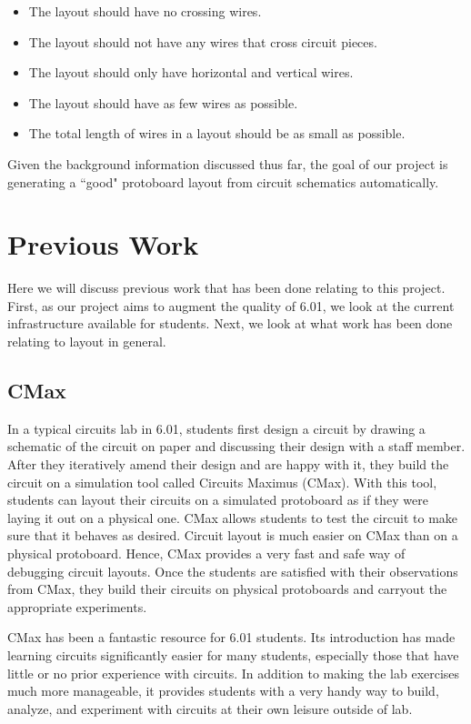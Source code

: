 \begin{itemize}
\item The layout should have no crossing wires.
\item The layout should not have any wires that cross circuit pieces.
\item The layout should only have horizontal and vertical wires.
\item The layout should have as few wires as possible.
\item The total length of wires in a layout should be as small as possible.
\end{itemize}

Given the background information discussed thus far, the goal of our project is
generating a ``good" protoboard layout from circuit schematics automatically.

\section{Previous Work}

Here we will discuss previous work that has been done relating to this project.
First, as our project aims to augment the quality of 6.01, we look at the
current infrastructure available for students. Next, we look at what work has
been done relating to layout in general.

\subsection{CMax}

In a typical circuits lab in 6.01, students first design a circuit by drawing a
schematic of the circuit on paper and discussing their design with a staff
member. After they iteratively amend their design and are happy with it, they
build the circuit on a simulation tool called Circuits Maximus (CMax). With this
tool, students can layout their circuits on a simulated protoboard as if they
were laying it out on a physical one. CMax allows students to test the circuit
to make sure that it behaves as desired. Circuit layout is much easier on CMax
than on a physical protoboard. Hence, CMax provides a very fast and safe way of
debugging circuit layouts. Once the students are satisfied with their
observations from CMax, they build their circuits on physical protoboards and
carryout the appropriate experiments.

CMax has been a fantastic resource for 6.01 students. Its introduction has made
learning circuits significantly easier for many students, especially those that
have little or no prior experience with circuits. In addition to making the lab
exercises much more manageable, it provides students with a very handy way to
build, analyze, and experiment with circuits at their own leisure outside of lab.

